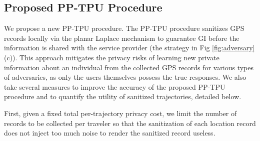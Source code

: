 \documentclass[10pt,journal,compsoc]{IEEEtran}
\begin{document}
\vspace{-9pt}
\subsection{Proposed PP-TPU Procedure}\label{subsec:method}\vspace{-3pt}
We propose  a new PP-TPU procedure. The PP-TPU procedure sanitizes GPS records locally via the planar Laplace mechanism to guarantee GI before the information is shared with the service provider (the strategy in Fig \ref{fig:adversary}(c)). This approach mitigates the privacy risks of learning new private information about an individual from the collected GPS records for various types of adversaries,  as only the users themselves possess the true responses. We also take several measures to improve the accuracy of the proposed PP-TPU procedure and to quantify  the utility of sanitized trajectories, detailed below.

First, given a fixed total per-trajectory privacy cost, we limit the number of records to be collected per traveler so that the sanitization of each location record does not inject too much noise to render the sanitized record useless.
\end{document}
